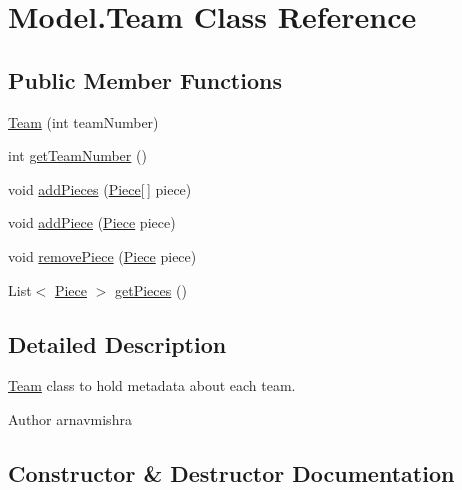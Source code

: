 \hypertarget{class_model_1_1_team}{}\section{Model.\+Team Class Reference}
\label{class_model_1_1_team}
\subsection*{Public Member Functions}
\begin{DoxyCompactItemize}
\item 
\hyperlink{class_model_1_1_team_a812b4a8f7c7facaec72a7c9b9f16d72c}{Team} (int team\+Number)
\item 
int \hyperlink{class_model_1_1_team_a2e60ec224f46ae7d0b682bdba79a1d85}{get\+Team\+Number} ()
\item 
void \hyperlink{class_model_1_1_team_ae29f91cb29d72c68f8e1d97b08d86eb4}{add\+Pieces} (\hyperlink{class_model_1_1_pieces_1_1_piece}{Piece}\mbox{[}$\,$\mbox{]} piece)
\item 
void \hyperlink{class_model_1_1_team_ab9243a9d3a778a57d4d25c9238b069f7}{add\+Piece} (\hyperlink{class_model_1_1_pieces_1_1_piece}{Piece} piece)
\item 
void \hyperlink{class_model_1_1_team_ad0e67548dd19712a5be9672c7d9b6d0e}{remove\+Piece} (\hyperlink{class_model_1_1_pieces_1_1_piece}{Piece} piece)
\item 
List$<$ \hyperlink{class_model_1_1_pieces_1_1_piece}{Piece} $>$ \hyperlink{class_model_1_1_team_a3abaa196ae93d5a51e3beca8c94bec76}{get\+Pieces} ()
\end{DoxyCompactItemize}


\subsection{Detailed Description}
\hyperlink{class_model_1_1_team}{Team} class to hold metadata about each team. \begin{DoxyAuthor}{Author}
arnavmishra 
\end{DoxyAuthor}


\subsection{Constructor \& Destructor Documentation}
\hypertarget{class_model_1_1_team_a812b4a8f7c7facaec72a7c9b9f16d72c}{}\label{class_model_1_1_team_a812b4a8f7c7facaec72a7c9b9f16d72c} 
